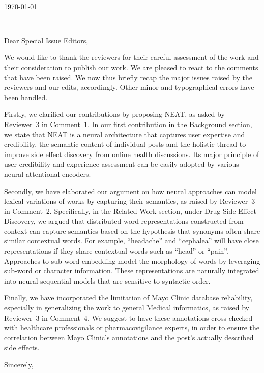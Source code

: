 \documentclass[11pt,a4paper]{letter} %
\def\opening#1{\thispagestyle{empty}
{\centering\fromaddress \vspace{0.6in} \\ %
\hspace*{\longindentation}\today\hspace*{\fill}\par} %
{\raggedright \toname \\ \toaddress \par} %
\vspace{0.4in} %
\noindent #1 %
}
\begin{document}

\begin{letter}
{}
\small
\opening{Dear Special Issue Editors,}

We would like to thank the reviewers for their careful assessment of the work and their consideration to publish our work. We are pleased to react to the comments that have been raised. We now thus briefly recap the major issues raised by the reviewers and our edits, accordingly. Other minor and typographical errors have been handled.

Firstly, we clarified our contributions by proposing NEAT, as asked by Reviewer~3 in Comment~1. In our first contribution in the Background section, we state that NEAT is a neural architecture that captures user expertise and credibility, the semantic content of individual posts and the holistic thread to improve side effect discovery from online health discussions. Its major principle of user credibility and experience assessment can be easily adopted by various neural attentional encoders.

Secondly, we have elaborated our argument on how neural approaches can model lexical variations of works by capturing their semantics, as raised by Reviewer~3 in Comment~2. Specifically, in the Related Work section, under Drug Side Effect Discovery, we argued that distributed  word  representations constructed from  context  can  capture semantics  based  on  the  hypothesis  that  synonyms  often  share  similar  contextual words. For example, ``headache'' and ``cephalea'' will have close representations if they share contextual words such as ``head'' or ``pain''. Approaches to sub-word embedding model the morphology of words by leveraging sub-word or character information. These representations are naturally integrated into neural sequential models that are sensitive to syntactic order.

Finally, we have incorporated the limitation of Mayo Clinic database reliability, especially in generalizing the work to general Medical informatics, as raised by Reviewer~3 in Comment~4. We suggest to have these annotations cross-checked with healthcare professionals or pharmacovigilance experts, in order to ensure the correlation between Mayo Clinic's annotations and the post's actually described side effects.

\closing{Sincerely,}


\end{letter}
\end{document}
